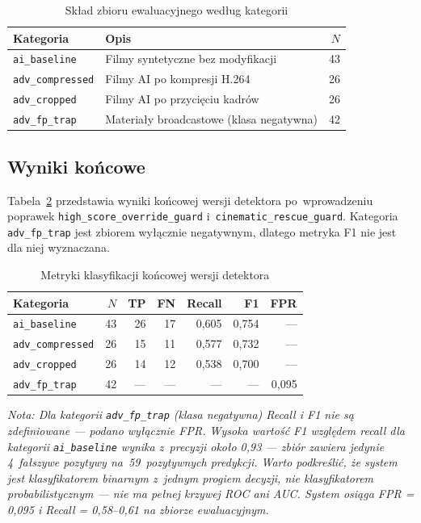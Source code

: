 \begin{table}[h]
\centering
\caption{Skład zbioru ewaluacyjnego według kategorii}
\label{tab:eval_splits}
\begin{tabular}{llr}
\toprule
Kategoria & Opis & $N$ \\
\midrule
\texttt{ai\_baseline}    & Filmy syntetyczne bez modyfikacji              & 43 \\
\texttt{adv\_compressed} & Filmy AI po kompresji H.264                    & 26 \\
\texttt{adv\_cropped}    & Filmy AI po przycięciu kadrów                 & 26 \\
\texttt{adv\_fp\_trap}   & Materiały broadcastowe (klasa negatywna)       & 42 \\
\bottomrule
\end{tabular}
\end{table}

\subsection*{Wyniki końcowe}

Tabela~\ref{tab:eval_results} przedstawia wyniki końcowej wersji detektora
po~wprowadzeniu poprawek \texttt{high\_score\_override\_guard}
i~\texttt{cinematic\_rescue\_guard}.
Kategoria \texttt{adv\_fp\_trap} jest zbiorem wyłącznie negatywnym,
dlatego metryka F1 nie jest dla niej wyznaczana.

\begin{table}[h]
\centering
\caption{Metryki klasyfikacji końcowej wersji detektora}
\label{tab:eval_results}
\begin{tabular}{lrrrrrr}
\toprule
Kategoria & $N$ & TP & FN & Recall & F1 & FPR \\
\midrule
\texttt{ai\_baseline}    & 43 & 26 & 17 & 0{,}605 & 0{,}754 & --- \\
\texttt{adv\_compressed} & 26 & 15 & 11 & 0{,}577 & 0{,}732 & --- \\
\texttt{adv\_cropped}    & 26 & 14 & 12 & 0{,}538 & 0{,}700 & --- \\
\texttt{adv\_fp\_trap}   & 42 & --- & --- & ---     & ---     & 0{,}095 \\
\bottomrule
\end{tabular}
\end{table}

\noindent\textit{Nota: Dla kategorii \texttt{adv\_fp\_trap} (klasa negatywna)
Recall i F1 nie są zdefiniowane — podano wyłącznie FPR.
Wysoka wartość F1 względem recall dla kategorii \texttt{ai\_baseline}
wynika z~precyzji około 0{,}93 — zbiór zawiera jedynie 4~fałszywe pozytywy
na~59~pozytywnych predykcji.
Warto podkreślić, że system jest klasyfikatorem binarnym z~jednym progiem decyzji,
nie klasyfikatorem probabilistycznym --- nie ma pełnej krzywej ROC ani AUC.
System osiąga FPR = 0,095 i Recall = 0,58–0,61 na zbiorze ewaluacyjnym.}

